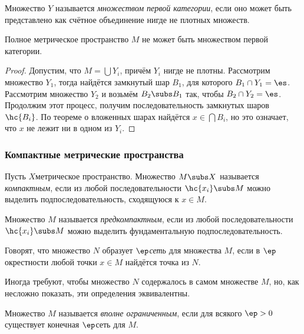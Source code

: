 \documentclass[a4paper]{article}
\begin{document}
\begin{df}
Множество $Y$ называется \emph{множеством первой категории}, если оно может быть представлено как счётное
объединение нигде не плотных множеств.
\end{df}

\begin{theorem}
Полное метрическое пространство $M$ не может быть множеством первой категории.
\end{theorem}
\begin{proof}
Допустим, что $M = \bigcup Y_i$, причём $Y_i$ нигде не плотны.
Рассмотрим множество $Y_1$, тогда найдётся замкнутый шар $B_1$, для которого $B_1 \cap Y_1 = \es$.
Рассмотрим множество $Y_2$ и возьмём $B_2 \subs B_1$ так, чтобы $B_2 \cap Y_2 = \es$.
Продолжим этот процесс, получим последовательность замкнутых шаров $\hc{B_i}$. По теореме о вложенных шарах
найдётся $x \in \bigcap B_i$, но это означает, что $x$ не лежит ни в одном из $Y_i$.
\end{proof}

\subsubsection{Компактные метрические пространства}

\begin{df}
Пусть $X$\т метрическое пространство. Множество $M \subs X$ называется \emph{компактным},
если из любой последовательности $\hc{x_i} \subs M$ можно выделить подпоследовательность,
сходящуюся к $x \in M$.
\end{df}

\begin{df}
Множество $M$ называется \emph{предкомпактным}, если
из любой последовательности $\hc{x_i} \subs M$ можно выделить фундаментальную
подпоследовательность.
\end{df}

\begin{df}
Говорят, что множество $N$ образует $\ep$\д \emph{сеть} для множества $M$,
если в $\ep$\д окрестности любой точки $x \in M$ найдётся точка из $N$.
\end{df}

\begin{note}
Иногда требуют, чтобы множество $N$ содержалось в самом множестве $M$,
но, как несложно показать, эти определения эквивалентны.
\end{note}

\begin{df}
Множество $M$ называется \emph{вполне ограниченным}, если для всякого $\ep > 0$
существует конечная $\ep$\д сеть для $M$.
\end{df}
\end{document}
